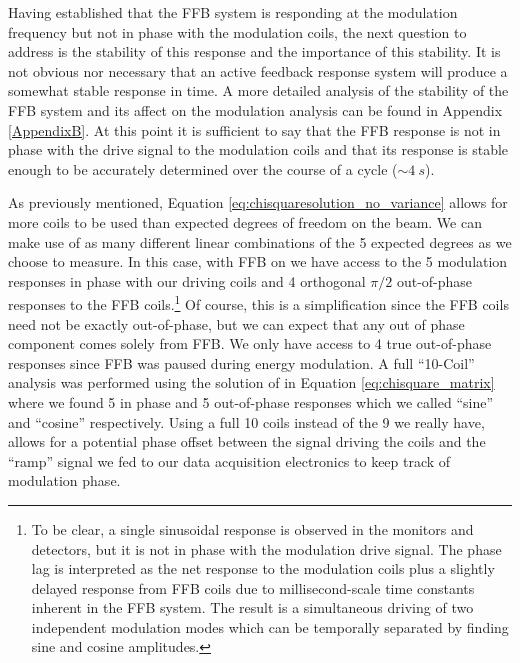 Having established that the FFB system is responding at the modulation frequency but not in phase with the modulation coils, the next question to address is the stability of this response and the importance of this stability. It is not obvious nor necessary that an active feedback response system will produce a somewhat stable response in time. A more detailed analysis of the stability of the FFB system and its affect on the modulation analysis can be found in Appendix \ref{AppendixB}. At this point it is sufficient to say that the FFB response is not in phase with the drive signal to the modulation coils and that its response is stable enough to be accurately determined over the course of a cycle ($\sim 4~s$). 

As previously mentioned, Equation \ref{eq:chisquaresolution_no_variance} allows for more coils to be used than expected degrees of freedom on the beam. We can make use of as many different linear combinations of the 5 expected degrees as we choose to measure. In this case, with FFB on we have access to the 5 modulation responses in phase with our driving coils and 4 orthogonal $\pi/2$ out-of-phase responses to the FFB coils.\footnote{To be clear, a single sinusoidal response is observed in the monitors and detectors, but it is not in phase with the modulation drive signal. The phase lag is interpreted as the net response to the modulation coils plus a slightly delayed response from FFB coils due to millisecond-scale time constants inherent in the FFB system. The result is a simultaneous driving of two independent modulation modes which can be temporally separated by finding sine and cosine amplitudes.} Of course, this is a simplification since the FFB coils need not be exactly out-of-phase, but we can expect that any out of phase component comes solely from FFB. We only have access to 4 true out-of-phase responses since FFB was paused during energy modulation. A full ``10-Coil'' analysis was performed using the solution of in Equation \ref{eq:chisquare_matrix} where we found 5 in phase and 5 out-of-phase responses which we called ``sine'' and ``cosine'' respectively. Using a full 10 coils instead of the 9 we really have, allows for a potential phase offset between the signal driving the coils and the ``ramp'' signal we fed to our data acquisition electronics to keep track of modulation phase.  

